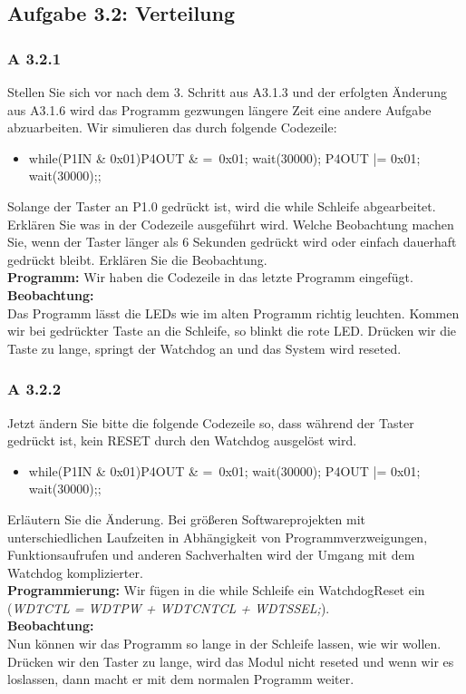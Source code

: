 \subsection*{Aufgabe 3.2: Verteilung}

\subsubsection*{A 3.2.1}
	Stellen Sie sich vor nach dem 3. Schritt aus A3.1.3 und der erfolgten Änderung aus A3.1.6 wird das Programm gezwungen längere Zeit eine andere 
	Aufgabe abzuarbeiten. Wir simulieren das durch folgende Codezeile:
	\begin{itemize}
		\item while(P1IN \& 0x01){P4OUT \& =~0x01; wait(30000); P4OUT |= 0x01; wait(30000);};
	\end{itemize}
	Solange der Taster an P1.0 gedrückt ist, wird die while Schleife abgearbeitet. Erklären Sie was in der Codezeile ausgeführt wird. Welche Beobachtung 	
	machen Sie, wenn der Taster länger als 6 Sekunden gedrückt wird oder einfach dauerhaft gedrückt bleibt. Erklären Sie die Beobachtung.\\

	\textbf{Programm:} Wir haben die Codezeile in das letzte Programm eingefügt.\\
	\textbf{Beobachtung:}\\
	Das Programm lässt die LEDs wie im alten Programm richtig leuchten. Kommen wir bei gedrückter Taste an die Schleife, so blinkt die rote LED. Drücken wir 
	die Taste zu lange, springt der Watchdog an und das System wird reseted.

\subsubsection*{A 3.2.2}
	Jetzt ändern Sie bitte die folgende Codezeile so, dass während der Taster gedrückt ist, kein RESET durch den Watchdog ausgelöst wird.
	\begin{itemize}
		\item while(P1IN \& 0x01){P4OUT \& =~0x01; wait(30000); P4OUT |= 0x01; wait(30000);};
	\end{itemize}
	Erläutern Sie die Änderung. Bei größeren Softwareprojekten mit unterschiedlichen Laufzeiten in Abhängigkeit von Programmverzweigungen, 
	Funktionsaufrufen und anderen Sachverhalten wird der Umgang mit dem Watchdog komplizierter.\\

	\textbf{Programmierung:} Wir fügen in die while Schleife ein WatchdogReset ein (\emph{WDTCTL = WDTPW + WDTCNTCL + WDTSSEL;}).\\
	\textbf{Beobachtung:}\\
	Nun können wir das Programm so lange in der Schleife lassen, wie wir wollen. Drücken wir den Taster zu lange, wird das Modul nicht reseted und wenn wir 
	es loslassen, dann macht er mit dem normalen Programm weiter.

